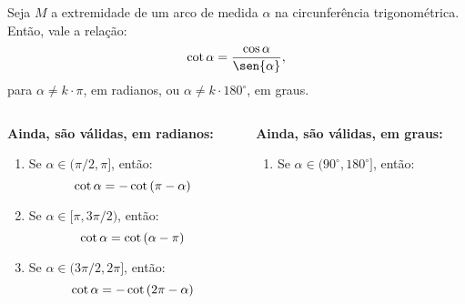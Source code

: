\begin{frame}
  \begin{theorem}
    Seja $M$ a extremidade de um arco de medida $\alpha$ na circunferência trigonométrica. Então, vale a relação:
    \begin{equation*}
      \cot{\alpha} = \frac{\cos{\alpha}}{\sen{\alpha}},
    \end{equation*}
    para $\alpha\not=k\cdot\pi$, em radianos, ou $\alpha\not=k\cdot 180^{\circ}$, em graus.
  \end{theorem}
  \begin{columns}[onlytextwidth]
    \begin{column}{0.49\textwidth}
      \begin{highlight}
        \textbf{Ainda, são válidas, em radianos:}
        \begin{enumerate}
          \item Se $\alpha\in(\pi/2,\pi]$, então:\vspace*{-0.2cm}
          \begin{equation*}
            \cot{\alpha}=-\cot{(\pi-\alpha)}\vspace*{-0.2cm}
          \end{equation*}
          \item Se $\alpha\in[\pi,3\pi/2)$, então:\vspace*{-0.2cm}
          \begin{equation*}
            \cot{\alpha}=\cot{(\alpha-\pi)}\vspace*{-0.2cm}
          \end{equation*}
          \item Se $\alpha\in(3\pi/2,2\pi]$, então:\vspace*{-0.2cm}
          \begin{equation*}
            \cot{\alpha}=-\cot{(2\pi-\alpha)}\vspace*{-0.2cm}
          \end{equation*}
        \end{enumerate}
      \end{highlight}
    \end{column}
    \begin{column}{0.49\textwidth}
      \begin{highlight}
        \textbf{Ainda, são válidas, em graus:}
        \begin{enumerate}
          \item Se $\alpha\in(90^{\circ},180^{\circ}]$, então:\vspace*{-0.2cm}

\end{enumerate}
\end{highlight}
\end{column}
\end{columns}
\end{frame}
